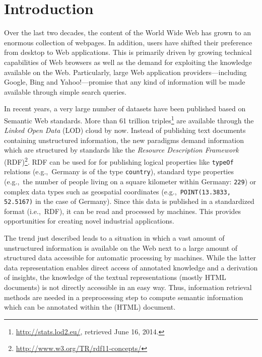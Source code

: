 \documentclass{acm_proc_article-sp}
\newcommand{\code}[1]{\texttt{#1}}
\newcommand{\eg}{e.g.,~}
\newcommand{\ie}{i.e.,~}
\begin{document}


\section{Introduction}

Over the last two decades, the content of the World Wide Web has grown to an enormous collection of webpages. 
In addition, users have shifted their preference from desktop to Web applications.
This is primarily driven by growing technical capabilities of Web browsers as well as the demand for exploiting the knowledge available on the Web.
Particularly, large Web application providers---including Google, Bing and \mbox{Yahoo}!---promise that any kind of information will be made available through simple search queries. 

In recent years, a very large number of datasets have been published based on Semantic Web standards.
More than 61 trillion triples\footnote{\url{http://stats.lod2.eu/}, retrieved June 16, 2014.} are available through the \emph{Linked Open Data} (LOD) cloud by now.
Instead of publishing text documents containing unstructured information, the new paradigms demand information which are structured by standards like the \textit{Resource Description Framework} (RDF)\footnote{\url{http://www.w3.org/TR/rdf11-concepts/}}.
RDF can be used for for publishing logical properties like \code{typeOf} relations (\eg Germany is of the type \code{country}), standard type properties (\eg the number of people living on a square kilometer within Germany: \code{229}) or complex data types such as geospatial coordinates (\eg \code{POINT(13.3833, 52.5167)} in the case of Germany).
Since this data is published in a standardized format (\ie RDF), it can be read and processed by machines.
This provides opportunities for creating novel industrial applications. 

The trend just described leads to a situation in which a vast amount of unstructured information is available on the Web next to a large amount of structured data accessible for automatic processing by machines.
While the latter data representation enables direct access of annotated knowledge and a derivation of insights, the knowledge of the textual representations (mostly HTML documents) is not directly accessible in an easy way. 
Thus, information retrieval methods are needed in a preprocessing step to compute semantic information which can be annotated within the (HTML) document.
\end{document}
